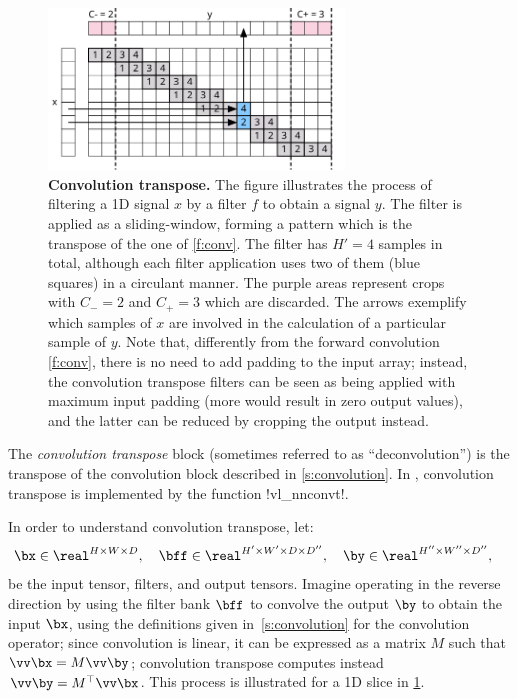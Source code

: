 \begin{figure}[t]
	\centering
	\includegraphics[width=0.7\textwidth]{figures/svg/convt}
	\caption{\textbf{Convolution transpose.} The figure illustrates the process of filtering a 1D signal $x$ by a filter $f$ to obtain a signal $y$. The filter is applied as a sliding-window, forming a pattern which is the transpose of the one of \cref{f:conv}. The filter has $H'=4$ samples in total, although each filter application uses two of them (blue squares) in a circulant manner. The purple areas represent crops with $C_-=2$ and $C_+=3$ which are discarded. The arrows exemplify which samples of $x$ are involved in the calculation of a particular sample of $y$. Note that, differently from the forward convolution \cref{f:conv}, there is no need to add padding to the input array; instead, the convolution transpose filters can be seen as being applied with maximum input padding (more would result in zero output values), and the latter can be reduced by cropping the output instead.}\label{f:convt}
\end{figure}

The \emph{convolution transpose} block (sometimes referred to as ``deconvolution'') is the transpose of the convolution block described in \cref{s:convolution}. In \matconvnet, convolution transpose is  implemented by the function !vl_nnconvt!.

In order to understand convolution transpose, let:
\[
 \bx\in\real^{H \times W \times D}, \quad
 \bff\in\real^{H' \times W' \times D \times D''}, \quad
 \by\in\real^{H'' \times W'' \times D''}, \quad
\]
be the input tensor, filters, and output tensors. Imagine operating in the reverse direction by using the filter bank $\bff$ to convolve the output $\by$ to obtain the input $\bx$, using the definitions given in~\cref{s:convolution} for the convolution operator; since convolution is linear, it can be expressed as a matrix $M$ such that  $\vv \bx = M \vv\by$; convolution transpose computes instead $\vv \by = M^\top \vv \bx$. This process is illustrated for a 1D slice in \cref{f:convt}.

